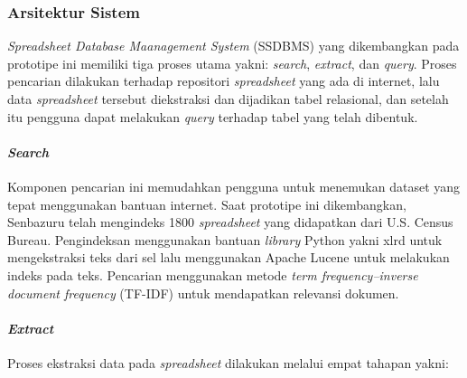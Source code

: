    \subsubsection{Arsitektur Sistem}

    \textit{Spreadsheet Database Maanagement System} (SSDBMS) yang dikembangkan pada prototipe ini memiliki tiga proses utama yakni: \textit{search}, \textit{extract}, dan \textit{query}. Proses pencarian dilakukan terhadap repositori \textit{spreadsheet} yang ada di internet, lalu data \textit{spreadsheet} tersebut diekstraksi dan dijadikan tabel relasional, dan setelah itu pengguna dapat melakukan \textit{query} terhadap tabel yang telah dibentuk.

        \paragraph{\textit{Search}}
        Komponen pencarian ini memudahkan pengguna untuk menemukan dataset yang tepat menggunakan bantuan internet. Saat prototipe ini dikembangkan, Senbazuru telah mengindeks 1800 \textit{spreadsheet} yang didapatkan dari U.S. Census Bureau. Pengindeksan menggunakan bantuan \textit{library} Python yakni xlrd untuk mengekstraksi teks dari sel lalu menggunakan Apache Lucene untuk melakukan indeks pada teks. Pencarian menggunakan metode \textit{term frequency–inverse document frequency} (TF-IDF) untuk mendapatkan relevansi dokumen.
        
        \paragraph{\textit{Extract}}
        Proses ekstraksi data pada \textit{spreadsheet} dilakukan melalui empat tahapan yakni:

